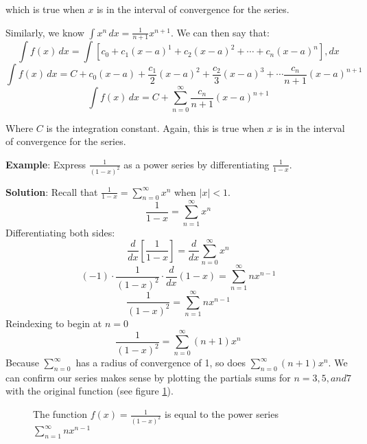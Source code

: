which is true when $x$ is in the interval of convergence for the series. 

Similarly, we know $\int x^n\,dx = \frac{1}{n+1}x^{n+1}$. We can then say that:
$$\int f(x) \,dx = \int \left[c_0 + c_1(x-a)^1 + c_2(x-a)^2 + \cdots + c_n(x-a)
^n\right],dx$$
$$\int f(x)\,dx = C + c_0(x-a) + \frac{c_1}{2}(x-a)^2 + \frac{c_2}{3}(x-a)^3 + 
\cdots \frac{c_n}{n+1}(x-a)^{n+1}$$
$$\int f(x)\,dx = C + \sum_{n=0}^\infty \frac{c_n}{n+1}(x-a)^{n+1}$$

Where $C$ is the integration constant. Again, this is true when $x$ is in the 
interval of convergence for the series. 

\textbf{Example}: Express $\frac{1}{(1-x)^2}$ as a power series by 
differentiating $\frac{1}{1-x}$. 

\textbf{Solution}: Recall that $\frac{1}{1-x} = \sum_{n=0}^\infty x^n$ when 
$|x|<1$. 
$$\frac{1}{1-x} = \sum_{n=1}^\infty x^n$$
Differentiating both sides:
$$\frac{d}{dx} \left[ \frac{1}{1-x} \right] = \frac{d}{dx} \sum_{n=0}^\infty 
x^n$$
$$(-1) \cdot \frac{1}{(1-x)^2} \cdot \frac{d}{dx}(1-x) = \sum_{n=1}^\infty 
nx^{n-1}$$
$$\frac{1}{(1-x)^2} = \sum_{n=1}^\infty nx^{n-1}$$
Reindexing to begin at $n = 0$
$$\frac{1}{(1-x)^2} = \sum_{n=0}^\infty (n+1)x^n$$
Because $\sum_{n=0}^\infty$ has a radius of convergence of 1, so does $\sum_{
n=0}^\infty (n+1)x^n$. We can confirm our series makes sense by plotting the 
partials sums for $n = 3, 5, and 7$ with the original function (see figure 
\ref{power1}).

\begin{figure}[htbp]
\centering
    \caption{The function $f(x) = \frac{1}{(1-x)^2}$ is equal to the power 
    series $\sum_{n=1}^\infty nx^{n-1}$}
    \label{power1}
\end{figure}

